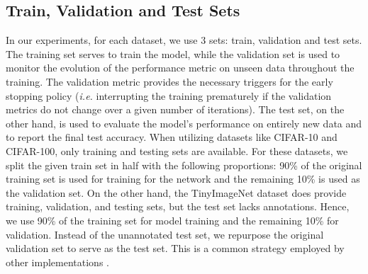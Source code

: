 \subsection{Train, Validation and Test Sets}

In our experiments, for each dataset, we use 3 sets: train, validation and test
sets. The training set serves to train the model, while the validation set is
used to monitor the evolution of the performance metric on unseen data
throughout the training. The validation metric provides the necessary triggers
for the early stopping policy (\emph{i.e.} interrupting the training prematurely
if the validation metrics do not change over a given number of iterations). The
test set, on the other hand, is used to evaluate the model's performance on
entirely new data and to report the final test accuracy. When utilizing datasets
like CIFAR-10 and CIFAR-100, only training and testing sets are available. For
these datasets, we split the given train set in half with the following
proportions: 90\% of the original training set is used for training for the
network and the remaining 10\% is used as the validation set. On the other hand,
the TinyImageNet dataset does provide training, validation, and testing sets,
but the test set lacks annotations. Hence, we use 90\% of the training set for
model training and the remaining 10\% for validation. Instead of the unannotated
test set, we repurpose the original validation set to serve as the test set.
This is a common strategy employed by other implementations
\cite{hanyuanxu2018tinyimagenet,nbdt,alvinwan2020nbdt}.\\
